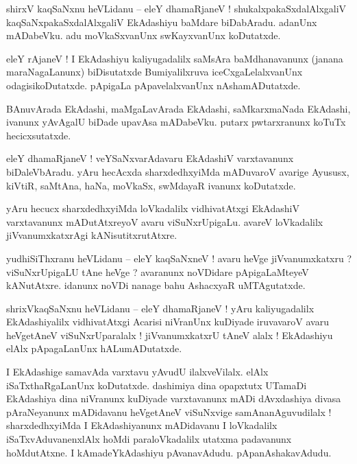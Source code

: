 \documentclass{article}
\begin{document}
\begin{mn}%
shirxV kaqSaNxnu heVLidanu -- eleY dhamaRjaneV ! shukalxpakaSxdalAlxgaliV kaqSaNxpakaSxdalAlxgaliV 
EkAdashiyu baMdare biDabAradu. adanUnx mADabeVku. adu moVkaSxvanUnx swKayxvanUnx koDutatxde.
\end{mn}

\begin{mn}%
eleY rAjaneV ! I EkAdashiyu kaliyugadalilx saMsAra baMdhanavanunx (janana maraNagaLanunx) 
biDisutatxde Bumiyalilxruva iceCxgaLelalxvanUnx odagisikoDutatxde. pApigaLa pApavelalxvanUnx 
nAshamADutatxde.
\end{mn}

\begin{mn}%
BAnuvArada EkAdashi, maMgaLavArada EkAdashi, saMkarxmaNada EkAdashi, ivanunx yAvAgalU biDade 
upavAsa mADabeVku. putarx pwtarxranunx koTuTx hecicxsutatxde.
\end{mn}

\begin{mn}%
eleY dhamaRjaneV ! veYSaNxvarAdavaru EkAdashiV varxtavanunx biDaleVbAradu. yAru hecAcxda 
sharxdedhxyiMda mADuvaroV avarige Ayususx, kiVtiR, saMtAna, haNa, moVkaSx, swMdayaR ivanunx 
koDutatxde.
\end{mn}

\begin{mn}%
yAru hecucx sharxdedhxyiMda loVkadalilx vidhivatAtxgi EkAdashiV varxtavanunx mADutAtxreyoV avaru 
viSuNxrUpigaLu. avareV loVkadalilx jiVvanumxkatxrAgi kANisutitxrutAtxre.
\end{mn}

\begin{mn}%
yudhiSiThxranu heVLidanu -- eleY kaqSaNxneV ! avaru heVge jiVvanumxkatxru ? viSuNxrUpigaLU tAne 
heVge ? avaranunx noVDidare pApigaLaMteyeV kANutAtxre. idanunx noVDi nanage bahu AshacxyaR 
uMTAgutatxde.
\end{mn}

\begin{mn}%
shrixVkaqSaNxnu heVLidanu -- eleY dhamaRjaneV ! yAru kaliyugadalilx EkAdashiyalilx vidhivatAtxgi 
Acarisi niVranUnx kuDiyade iruvavaroV avaru heVgetAneV viSuNxrUparalalx ! jiVvanumxkatxrU tAneV 
alalx ! EkAdashiyu elAlx pApagaLanUnx hALumADutatxde. 
\end{mn}

\begin{mn}%
I EkAdashige samavAda varxtavu yAvudU ilalxveVilalx. elAlx iSaTxthaRgaLanUnx koDutatxde. dashimiya 
dina opapxtutx UTamaDi EkAdashiya dina niVranunx kuDiyade varxtavanunx mADi dAvxdashiya divasa 
pAraNeyanunx mADidavanu heVgetAneV viSuNxvige samAnanAguvudilalx ! sharxdedhxyiMda I EkAdashiyanunx 
mADidavanu I loVkadalilx iSaTxvAduvanenxlAlx hoMdi paraloVkadalilx utatxma padavanunx hoMdutAtxne. 
I kAmadeYkAdashiyu pAvanavAdudu. pApanAshakavAdudu.
\end{mn}
\end{document}
